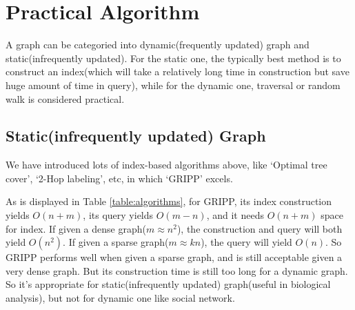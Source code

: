 \documentclass[11pt]{article}
\begin{document}
\section{Practical Algorithm}
A graph can be categoried into dynamic(frequently updated) graph and static(infrequently updated). For the static one, the typically best method is to construct an index(which will take a relatively long time in construction but save huge amount of time in query), while for the dynamic one, traversal or random walk is considered practical.
\subsection{Static(infrequently updated) Graph}
We have introduced lots of index-based algorithms above, like `Optimal tree cover', `2-Hop labeling', etc, in which `GRIPP' excels.

As is displayed in Table \ref{table:algorithms}, for GRIPP, its index construction yields $O(n+m)$, its query yields $O(m-n)$, and it needs $O(n+m)$ space for index. If given a dense graph($m\approx n^2$), the construction and query will both yield $O(n^2)$. If given a sparse graph($m\approx kn$), the query will yield $O(n)$. So GRIPP performs well when given a sparse graph, and is still acceptable given a very dense graph. But its construction time is still too long for a dynamic graph. So it's appropriate for static(infrequently updated) graph(useful in biological analysis), but not for dynamic one like social network.
\end{document}
